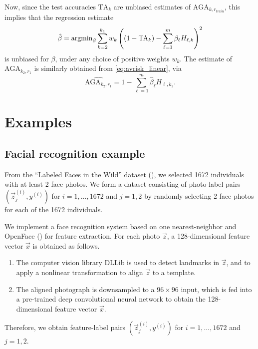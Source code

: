 \documentclass[12pt]{article}
\begin{document}
Now, since the test accuracies $\text{TA}_k$ are unbiased estimates of
$\text{AGA}_{k, r_{train}}$, this implies that the regression
estimate
\[
\hat{\beta} = \text{argmin}_\beta \sum_{k=2}^{k_1} w_k \left( (1 - \text{TA}_k) - \sum_{\ell=1}^m \beta_\ell H_{\ell, k}\right)^2
\]
is unbiased for $\beta$, under any choice of positive weights $w_k$.
The estimate of $\text{AGA}_{k_2,r_1}$ is similarly obtained
from \eqref{eq:avrisk_linear}, via
\begin{equation}\label{eq:avrisk_hat}
\widehat{\text{AGA}_{k_2,r_1}} = 1 - \sum_{\ell=1}^m \hat{\beta}_\ell H_{\ell, k_2}.
\end{equation}

\section{Examples}\label{sec:extrapolation_example}

\subsection{Facial recognition example}

From the ``Labeled Faces in the Wild'' dataset (\cite{LFWTech}), we
selected 1672 individuals with at least 2 face photos.  We form a
dataset consisting of photo-label pairs $(\vec{z}_j^{(i)}, y^{(i)})$
for $i = 1,\hdots, 1672$ and $j = 1,2$ by randomly selecting 2 face
photos for each of the 1672 individuals.

We implement a face recognition system based on one nearest-neighbor
and OpenFace (\cite{amos2016openface}) for feature extraction.  For
each photo $\vec{z}$, a 128-dimensional feature vector $\vec{x}$ is
obtained as follows.
\begin{enumerate}
\item The computer vision library DLLib is used to detect landmarks in
  $\vec{z}$, and to apply a nonlinear transformation to align
  $\vec{z}$ to a template.
\item The aligned photograph is downsampled to a $96 \times 96$ input,
  which is fed into a pre-trained deep convolutional neural network to
  obtain the 128-dimensional feature vector $\vec{x}$.
\end{enumerate}
Therefore, we obtain feature-label pairs $(\vec{z}_j^{(i)}, y^{(i)})$
for $i = 1,\hdots, 1672$ and $j = 1,2$.
\end{document}
